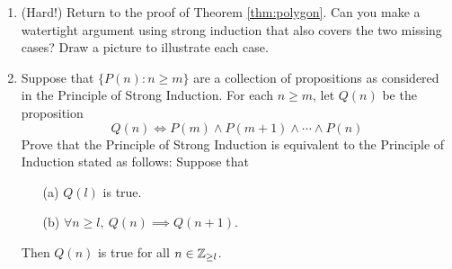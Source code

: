 \begin{exercises}{}{}
\begin{enumerate}
	\item (Hard!) Return to the proof of Theorem \ref{thm:polygon}. Can you make a watertight argument using strong induction that also covers the two missing cases? Draw a picture to illustrate each case.
	
	\item Suppose that $\{P(n):n\ge m\}$ are a collection of propositions as considered in the Principle of Strong Induction. For each $n\ge m$, let $Q(n)$ be the proposition
	\[Q(n)\iff P(m)\wedge P(m+1)\wedge\cdots\wedge P(n)\]
	Prove that the Principle of Strong Induction is equivalent to the Principle of Induction stated as follows: Suppose that
	\begin{enumerate}
  	\item[(a)] $Q(l)$ is true.
  	\item[(b)] $\forall n\ge l,\ Q(n)\implies Q(n+1)$.
	\end{enumerate}
	Then $Q(n)$ is true for all $n\in\mathbb{Z}_{\ge l}$.
	
\end{enumerate}
\end{exercises}

